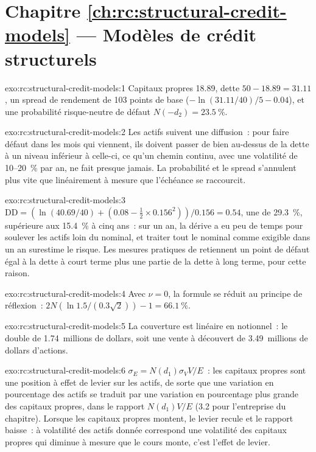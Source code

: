 \section*{Chapitre \ref{ch:rc:structural-credit-models} --- Modèles de crédit structurels}

\begin{solution}{exo:rc:structural-credit-models:1}
Capitaux propres 18.89, dette $50-18.89 = 31.11$, un spread de rendement de 103 points de base
($-\ln(31.11/40)/5-0.04$), et une probabilité risque-neutre de défaut $N(-d_2) = 23.5~\%$.
\end{solution}

\begin{solution}{exo:rc:structural-credit-models:2}
Les actifs suivent une diffusion~: pour faire défaut dans les mois qui viennent, ils doivent passer de bien au-dessus de la dette
à un niveau inférieur à celle-ci, ce qu'un chemin continu, avec une volatilité de 10--20~\% par an, ne fait
presque jamais. La probabilité et le spread s'annulent plus vite que linéairement à mesure que l'échéance
se raccourcit.
\end{solution}

\begin{solution}{exo:rc:structural-credit-models:3}
$\mathrm{DD} = (\ln(40.69/40)+(0.08-\tfrac12\times0.156^2))/0.156 = 0.54$, une  de 29.3~\%, supérieure aux 15.4~\% à cinq ans~: sur un an, la dérive a eu peu de temps pour
soulever les actifs loin du nominal, et traiter tout le nominal comme exigible dans un an
surestime le risque. Les mesures pratiques de  retiennent un point de défaut
égal à la dette à court terme plus une partie de la dette à long terme, pour cette raison.
\end{solution}

\begin{solution}{exo:rc:structural-credit-models:4}
Avec $\nu = 0$, la formule se réduit au principe de réflexion~: $2N(\ln1.5/(0.3\sqrt2))-1 =
66.1~\%$.
\end{solution}

\begin{solution}{exo:rc:structural-credit-models:5}
La couverture est linéaire en notionnel~: le double de 1.74~millions de dollars, soit une vente à découvert
de 3.49~millions de dollars d'actions.
\end{solution}

\begin{solution}{exo:rc:structural-credit-models:6}
$\sigma_E = N(d_1)\sigma_VV/E$~: les capitaux propres sont une position à effet de levier sur les actifs, de sorte que
une variation en pourcentage des actifs se traduit par une variation en pourcentage plus grande des capitaux propres, dans le rapport
$N(d_1)V/E$ (3.2 pour l'entreprise du chapitre). Lorsque les capitaux propres montent, le levier recule et le rapport
baisse~: à volatilité des actifs donnée correspond une volatilité des capitaux propres qui diminue à mesure que le cours monte,
c'est l'effet de levier.
\end{solution}

